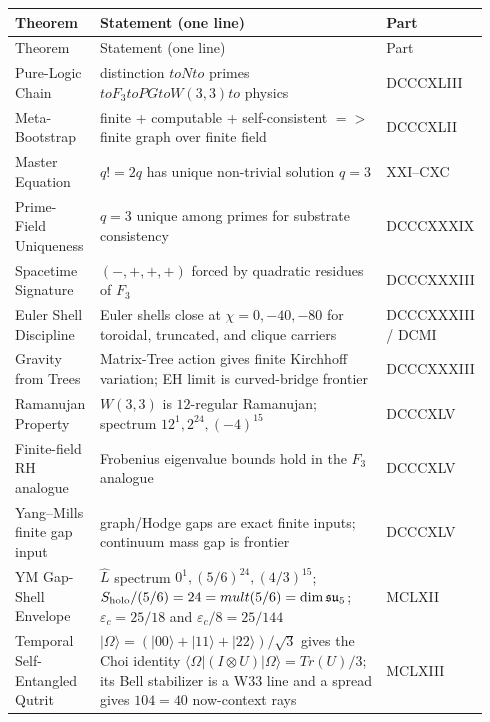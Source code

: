 \documentclass[11pt]{article}
\def\mathbb#1{#1}%
\def\mathrm#1{#1}%
\def\textbf#1{#1}%
\def\cdot{ }%
\def\to{ to }%
\def\Rightarrow{ => }%
\begin{document}
{\tiny
\sloppy
\renewcommand{\arraystretch}{1.2}
\setlength{\tabcolsep}{1pt}
\begin{longtable}{>{\raggedright\arraybackslash}p{0.18\linewidth} >{\raggedright\arraybackslash}p{0.63\linewidth} >{\raggedright\arraybackslash}p{0.13\linewidth}}
\toprule
\textbf{Theorem} & \textbf{Statement (one line)} & \textbf{Part} \\
\midrule
\endfirsthead
\toprule
\textbf{Theorem} & \textbf{Statement (one line)} & \textbf{Part} \\
\midrule
\endhead
\bottomrule
\endfoot
\bottomrule
\endlastfoot
Pure-Logic Chain & distinction $\to \mathbb{N} \to $ primes $\to \mathbb{F}_3 \to \mathrm{PG} \to W(3,3) \to $ physics & DCCCXLIII \\
Meta-Bootstrap & finite + computable + self-consistent $\Rightarrow$ finite graph over finite field & DCCCXLII \\
Master Equation & $q! = 2q$ has unique non-trivial solution $q = 3$ & XXI--CXC \\
Prime-Field Uniqueness & $q = 3$ unique among primes for substrate consistency & DCCCXXXIX \\
Spacetime Signature & $(-,+,+,+)$ forced by quadratic residues of $\mathbb{F}_3$ & DCCCXXXIII \\
Euler Shell Discipline & Euler shells close at $\chi=0,-40,-80$ for toroidal, truncated, and clique carriers & DCCCXXXIII / DCMI \\
Gravity from Trees & Matrix-Tree action gives finite Kirchhoff variation; EH limit is curved-bridge frontier & DCCCXXXIII \\
Ramanujan Property & $W(3,3)$ is $12$-regular Ramanujan; spectrum $12^1,2^{24},(-4)^{15}$ & DCCCXLV \\
Finite-field RH analogue & Frobenius eigenvalue bounds hold in the $\mathbb{F}_3$ analogue & DCCCXLV \\
Yang--Mills finite gap input & graph/Hodge gaps are exact finite inputs; continuum mass gap is frontier & DCCCXLV \\
YM Gap-Shell Envelope & $\widehat L$ spectrum $0^1,(5/6)^{24},(4/3)^{15}$; $S_{\rm holo}/(5/6)=24=\mathrm{mult}(5/6)=\dim\mathfrak{su}_5$; $\varepsilon_c=25/18$ and $\varepsilon_c/8=25/144$ & MCLXII \\
Temporal Self-Entangled Qutrit & $|\Omega\rangle=(|00\rangle+|11\rangle+|22\rangle)/\sqrt3$ gives the Choi identity $\langle\Omega|(I\otimes U)|\Omega\rangle=\mathrm{Tr}(U)/3$; its Bell stabilizer is a W33 line and a spread gives $10\cdot4=40$ now-context rays & MCLXIII \\

\end{longtable}}
\end{document}
